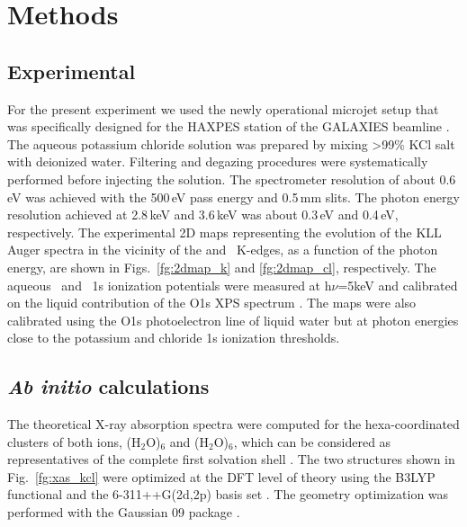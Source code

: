 \section{Methods} \label{sec:methods}
\subsection{Experimental}

For the present experiment we used the newly operational microjet setup that was specifically designed for the HAXPES station of the GALAXIES beamline \citep{ceolin13:188,rueff15:175}. The aqueous potassium chloride solution was prepared by mixing >99\% KCl salt with deionized water. Filtering and degazing procedures were systematically performed before injecting the solution. The spectrometer resolution of about 0.6\,eV was achieved with the 500\,eV pass energy and 0.5\,mm slits. The photon energy resolution achieved at 2.8\,keV and 3.6\,keV was about 0.3\,eV and 0.4\,eV, respectively. The experimental 2D maps representing the evolution of the KLL Auger spectra in the vicinity of the \cli and \ki~K-edges, as a function of the photon energy, are shown in Figs.\ \ref{fg:2dmap_k} and \ref{fg:2dmap_cl}, respectively. The aqueous \ki~and \cli~1s ionization potentials were measured at h$\nu$=5keV and calibrated on the liquid contribution of the O1s XPS spectrum \cite{winter06:1176}. The maps were also calibrated using the O1s photoelectron line of liquid water but at photon energies close to the potassium and chloride 1s ionization thresholds.


\subsection{{\bf{\it Ab initio}} calculations}

The theoretical X-ray absorption spectra were computed for the hexa-coordinated clusters of both ions, \ki(H$_2$O)$_6$ and \cli(H$_2$O)$_6$, which can be considered as representatives of the complete first solvation shell \citep{Ohtaki93:1157,soper06:180,ma14:1006}. The two structures shown in Fig.\ \ref{fg:xas_kcl} were optimized at the DFT level of theory using the B3LYP functional and the 6-311++G(2d,2p) basis set \citep{Krishnan80:650,Blaudeau97:5016}. The geometry optimization was performed with the Gaussian 09 package \citep{g09}.


